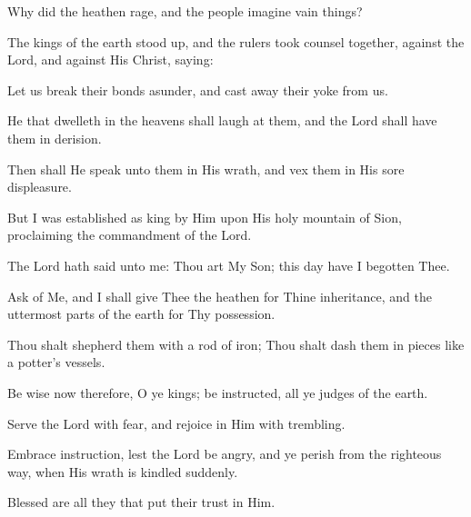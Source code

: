 Why did the heathen rage, and the people imagine vain things?

The kings of the earth stood up, and the rulers took counsel together, against the Lord, and against His Christ, saying:

Let us break their bonds asunder, and cast away their yoke from us.

He that dwelleth in the heavens shall laugh at them, and the Lord shall have them in derision.

Then shall He speak unto them in His wrath, and vex them in His sore displeasure.

But I was established as king by Him upon His holy mountain of Sion, proclaiming the commandment of the Lord.

The Lord hath said unto me: Thou art My Son; this day have I begotten Thee.

Ask of Me, and I shall give Thee the heathen for Thine inheritance, and the uttermost parts of the earth for Thy possession.

Thou shalt shepherd them with a rod of iron; Thou shalt dash them in pieces like a potter's vessels.

Be wise now therefore, O ye kings; be instructed, all ye judges of the earth.

Serve the Lord with fear, and rejoice in Him with trembling.

Embrace instruction, lest the Lord be angry, and ye perish from the righteous way, when His wrath is kindled suddenly.

Blessed are all they that put their trust in Him.
